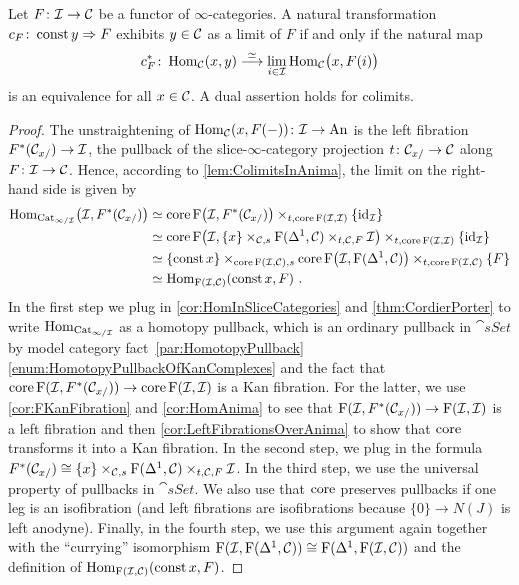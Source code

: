 \begin{cor}\label{cor:HomPreservesColimits}
	Let $F\colon \Ii\morphism\Cc$ be a functor of $\infty$-categories. A natural transformation $c_F\colon \operatorname{const} y\Rightarrow F$ exhibits $y\in \mathcal{C}$ as a limit of $F$ if and only if the natural map
	\begin{equation*}
		c_F^*\colon \Hom_\Cc\!\left(x,y\right)\overset{\simeq}{\longrightarrow}\limit_{i\in\Ii}\Hom_\Cc\lef(x,F(i)\righ)
	\end{equation*}
	is an equivalence for all $x\in \mathcal{C}$. A dual assertion holds for colimits.
\end{cor}
\begin{proof}
	The unstraightening of $\operatorname{Hom}_{\mathcal{C}}(x,F(-))\colon \mathcal{I}\rightarrow\mathrm{An}$ is the left fibration $F^*(\mathcal{C}_{x/})\rightarrow \mathcal{I}$, the pullback of the slice-$\infty$-category projection $t\colon \mathcal{C}_{x/}\rightarrow \mathcal{C}$ along $F\colon \mathcal{I}\rightarrow\mathcal{C}$. Hence, according to \cref{lem:ColimitsInAnima}, the limit on the right-hand side is given by
	\begin{align*}
		\Hom_{\Cat_{\infty/\Ii}}\bigl(\Ii,F^*(\Cc_{x/})\bigr)&\simeq \core\F\bigl(\Ii,F^*(\Cc_{x/})\bigr)\times_{t,\core\F(\Ii,\Ii)}\{\id_\Ii\}\\%
		&\simeq \core\F\bigl(\Ii,\{x\}\times_{\Cc,s}\F(\Delta^1,\Cc)\times_{t,\Cc,F}\Ii\bigr)\times_{t,\core \F(\Ii,\Ii)}\{\id_\Ii\}\\
		&\simeq \{\const x\}\times_{\core \F(\Ii,\Cc),s}\core \F\bigl(\Ii,\F(\Delta^1,\Cc)\bigr)\times_{t,\core \F(\Ii,\Cc)}\{F\}\\
		&\simeq \Hom_{\F(\Ii,\Cc)}\!\left(\const x,F\right)\,.
	\end{align*}
	In the first step we plug in \cref{cor:HomInSliceCategories} and \cref{thm:CordierPorter} to write $\operatorname{Hom}_{\mathrm{Cat}_{\infty/\mathcal{I}}}$ as a homotopy pullback, which is an ordinary pullback in $\cat{sSet}$ by model category fact~\cref{par:HomotopyPullback}\cref{enum:HomotopyPullbackOfKanComplexes} and the fact that $\operatorname{core}\operatorname{F}(\mathcal{I},F^*(\mathcal{C}_{x/}))\rightarrow\operatorname{core}\operatorname{F}(\mathcal{I},\mathcal{I})$ is a Kan fibration. For the latter, we use \cref{cor:FKanFibration} and \cref{cor:HomAnima} to see that $\operatorname{F}(\mathcal{I},F^*(\mathcal{C}_{x/}))\rightarrow\operatorname{F}(\mathcal{I},\mathcal{I})$ is a left fibration and then \cref{cor:LeftFibrationsOverAnima} to show that $\operatorname{core}$ transforms it into a Kan fibration. In the second step, we plug in the formula $F^*(\mathcal{C}_{x/})\cong\{x\}\times_{\mathcal{C},s}\operatorname{F}(\Delta^1,\mathcal{C})\times_{t,\mathcal{C},F}\mathcal{I}$. In the third step, we use the universal property of pullbacks in $\cat{sSet}$. We also use that $\operatorname{core}$ preserves pullbacks if one leg is an isofibration (and left fibrations are isofibrations because $\{0\}\rightarrow N(J)$ is left anodyne). Finally, in the fourth step, we use this argument again together with the \enquote{currying} isomorphism $\operatorname{F}(\mathcal{I},\operatorname{F}(\Delta^1,\mathcal{C}))\cong \operatorname{F}(\Delta^1,\operatorname{F}(\mathcal{I},\mathcal{C}))$ and the definition of $\operatorname{Hom}_{\operatorname{F}(\mathcal{I},\mathcal{C})}(\operatorname{const} x,F)$.
	

\end{proof}
